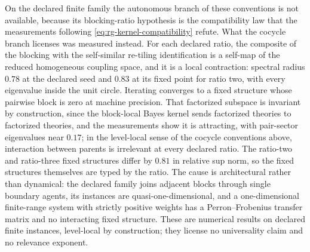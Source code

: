 On the declared finite family the autonomous branch of these conventions is
not available, because its blocking-ratio hypothesis is the compatibility law
that the measurements following \eqref{eq:rg-kernel-compatibility} refute.
What the cocycle branch licenses was measured instead.  For each declared
ratio, the composite of the blocking with the self-similar re-tiling
identification is a self-map of the reduced homogeneous coupling space, and it
is a local contraction: spectral radius $0.78$ at the declared seed and
$0.83$ at its fixed point for ratio two, with every eigenvalue inside the unit
circle.  Iterating converges to a fixed structure whose pairwise block is zero
at machine precision.  That factorized subspace is invariant by construction,
since the block-local Bayes kernel sends factorized theories to factorized
theories, and the measurements show it is attracting, with pair-sector
eigenvalues near $0.17$; in the level-local sense of the cocycle conventions
above, interaction between parents is irrelevant at every declared ratio.
The ratio-two and ratio-three fixed structures differ by $0.81$ in relative
sup norm, so the fixed structures themselves are typed by the ratio.  The
cause is architectural rather than dynamical: the declared family joins
adjacent blocks through single boundary agents, its instances are
quasi-one-dimensional, and a one-dimensional finite-range system with strictly
positive weights has a Perron--Frobenius transfer matrix and no interacting
fixed structure.  These are numerical results on declared finite instances,
level-local by construction; they license no universality claim and no
relevance exponent.  

